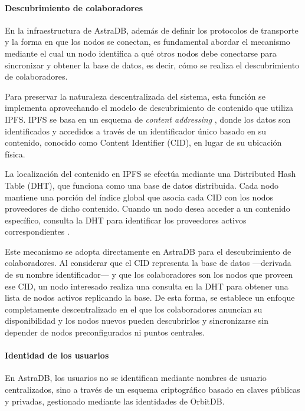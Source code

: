 \paragraph{Descubrimiento de colaboradores}

En la infraestructura de AstraDB, además de definir los protocolos de transporte y la forma en que los nodos se conectan, es fundamental abordar el mecanismo mediante el cual un nodo identifica a qué otros nodos debe conectarse para sincronizar y obtener la base de datos, es decir, cómo se realiza el descubrimiento de colaboradores.

Para preservar la naturaleza descentralizada del sistema, esta función se implementa aprovechando el modelo de descubrimiento de contenido que utiliza IPFS. IPFS se basa en un esquema de \textit{content addressing} \cite{content-addressing}, donde los datos son identificados y accedidos a través de un identificador único basado en su contenido, conocido como Content Identifier (CID), en lugar de su ubicación física.

La localización del contenido en IPFS se efectúa mediante una Distributed Hash Table (DHT), que funciona como una base de datos distribuida. Cada nodo mantiene una porción del índice global que asocia cada CID con los nodos proveedores de dicho contenido. Cuando un nodo desea acceder a un contenido específico, consulta la DHT para identificar los proveedores activos correspondientes \cite{dht}.

Este mecanismo se adopta directamente en AstraDB para el descubrimiento de colaboradores. Al considerar que el CID representa la base de datos —derivada de su nombre identificador— y que los colaboradores son los nodos que proveen ese CID, un nodo interesado realiza una consulta en la DHT para obtener una lista de nodos activos replicando la base. De esta forma, se establece un enfoque completamente descentralizado en el que los colaboradores anuncian su disponibilidad y los nodos nuevos pueden descubrirlos y sincronizarse sin depender de nodos preconfigurados ni puntos centrales.

\paragraph{Identidad de los usuarios}

En AstraDB, los usuarios no se identifican mediante nombres de usuario centralizados, sino a través de un esquema criptográfico basado en claves públicas y privadas, gestionado mediante las identidades de OrbitDB.

